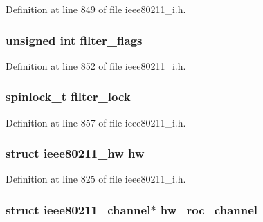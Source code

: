 Definition at line 849 of file ieee80211\-\_\-i.\-h.

\hypertarget{structieee80211__local_af57092f118989725a35071734086b077}{
\subsubsection[{filter\-\_\-flags}]{\setlength{\rightskip}{0pt plus 5cm}unsigned int filter\-\_\-flags}}\label{structieee80211__local_af57092f118989725a35071734086b077}


Definition at line 852 of file ieee80211\-\_\-i.\-h.

\hypertarget{structieee80211__local_aa04ada770caf28109eee6faf56a43ee6}{
\subsubsection[{filter\-\_\-lock}]{\setlength{\rightskip}{0pt plus 5cm}spinlock\-\_\-t filter\-\_\-lock}}\label{structieee80211__local_aa04ada770caf28109eee6faf56a43ee6}


Definition at line 857 of file ieee80211\-\_\-i.\-h.

\hypertarget{structieee80211__local_a076bd779234ea1780e71eee200bc0d2c}{
\subsubsection[{hw}]{\setlength{\rightskip}{0pt plus 5cm}struct ieee80211\-\_\-hw hw}}\label{structieee80211__local_a076bd779234ea1780e71eee200bc0d2c}


Definition at line 825 of file ieee80211\-\_\-i.\-h.

\hypertarget{structieee80211__local_a5e8f22962db463298122a3ce5067f785}{
\subsubsection[{hw\-\_\-roc\-\_\-channel}]{\setlength{\rightskip}{0pt plus 5cm}struct ieee80211\-\_\-channel$\ast$ hw\-\_\-roc\-\_\-channel}}\label{structieee80211__local_a5e8f22962db463298122a3ce5067f785}


